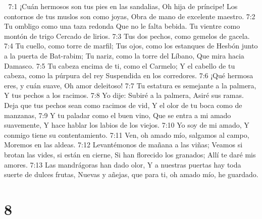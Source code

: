 
7:1 ¡Cuán hermosos son tus pies en las sandalias,  
Oh hija de príncipe!  
Los contornos de tus muslos son como joyas,  
Obra de mano de excelente maestro.  
7:2 Tu ombligo como una taza redonda  
Que no le falta bebida.  
Tu vientre como montón de trigo  
Cercado de lirios.  
7:3 Tus dos pechos, como gemelos de gacela.  
7:4 Tu cuello, como torre de marfil;  
Tus ojos, como los estanques de Hesbón junto a la puerta de Bat-rabim;  
Tu nariz, como la torre del Líbano,  
Que mira hacia Damasco.  
7:5 Tu cabeza encima de ti, como el Carmelo;  
Y el cabello de tu cabeza, como la púrpura del rey  
Suspendida en los corredores. 
7:6 ¡Qué hermosa eres, y cuán suave,  
Oh amor deleitoso!  
7:7 Tu estatura es semejante a la palmera,  
Y tus pechos a los racimos.  
7:8 Yo dije: Subiré a la palmera,  
Asiré sus ramas.  
Deja que tus pechos sean como racimos de vid,  
Y el olor de tu boca como de manzanas,  
7:9 Y tu paladar como el buen vino,  
Que se entra a mi amado suavemente,  
Y hace hablar los labios de los viejos.  
7:10 Yo soy de mi amado,  
Y conmigo tiene su contentamiento.  
7:11 Ven, oh amado mío, salgamos al campo,  
Moremos en las aldeas.  
7:12 Levantémonos de mañana a las viñas;  
Veamos si brotan las vides, si están en cierne,  
Si han florecido los granados;  
Allí te daré mis amores.  
7:13 Las mandrágoras han dado olor,  
Y a nuestras puertas hay toda suerte de dulces frutas,  
Nuevas y añejas, que para ti, oh amado mío, he guardado. 

\chapter{8}

